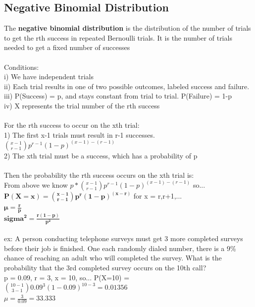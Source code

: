 \documentclass[12pt, a4paper]{article}
\begin{document}
	\subsection{Negative Binomial Distribution}
	The \textbf{negative binomial distribution} is the distribution of the number of trials to get the rth success in repeated Bernoulli trials. It is the number of trials needed to get a fixed number of successes \\~\\
	Conditions: \\
	i) We have independent trials \\
	ii) Each trial results in one of two possible outcomes, labeled success and failure. \\
	iii) P(Success) = p, and stays constant from trial to trial. P(Failure) = 1-p \\
	iv) X represents the trial number of the rth success \\~\\
	For the rth success to occur on the xth trial: \\
	1) The first x-1 trials must result in r-1 successes. $\binom{x-1}{r-1}p^{r-1}(1-p)^{(x-1)-(r-1)}$ \\
	2) The xth trial must be a success, which has a probability of p \\~\\
	Then the probability the rth success occurs on the xth trial is: \\
	From above we know $p*\binom{x-1}{r-1}p^{r-1}(1-p)^{(x-1)-(r-1)}$ so... \\
	$\mathbf{P(X=x) = \binom{x-1}{r-1}p^{r}(1-p)^{(x-r)}}$ for x = r,r+1,... \\
	$\mathbf{\mu = \frac{r}{p}}$ \\
	$\mathbf{sigma^2 = \frac{r(1-p)}{p^2}}$ \\~\\
	ex: A person conducting telephone surveys must get 3 more completed surveys before their job is finished. One each randomly dialed number, there is a 9\% chance of reaching an adult who will completed the survey. What is the probability that the 3rd completed survey occurs on the 10th call? \\
	p = 0.09, r = 3, x = 10, so... P(X=10) = $\binom{10-1}{3-1}0.09^3(1-0.09)^{10-3} = 0.01356$ \\
	$\mu = \frac{3}{0.09} = 33.333$ \\~\\
	
\end{document}
